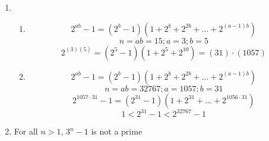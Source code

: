 \begin{enumerate}
    \item
    \begin{enumerate}
        \item 
            \[2^{ab} - 1 = (2^b - 1)(1 + 2^b + 2^{2b} + ... + 2^{(a-1)b})\]
            \[n = ab = 15; a = 3; b = 5\]
            \[2^{(3)(5)} = (2^5 - 1)(1+ 2^5 + 2^{10}) = (31)\cdot(1057)\]
        \item 
            \[2^{ab} - 1 = (2^b - 1)(1 + 2^b + 2^{2b} + ... + 2^{(a-1)b})\]
            \[n = ab = 32767; a = 1057; b = 31\]
            \[2^{1057\cdot31} - 1 = (2^{31} - 1)(1+ 2^{31} + ... + 2^{1056\cdot31})\]
            \[1 < 2^{31} - 1 < 2^{32767} - 1\]
    \end{enumerate}
    \item
        \hfill
        
        \begin{multicols}{2}
            \begin{center}
            \end{center}
            For all \(n > 1\), \(3^n - 1\) is not a prime


\end{multicols}
\end{enumerate}
